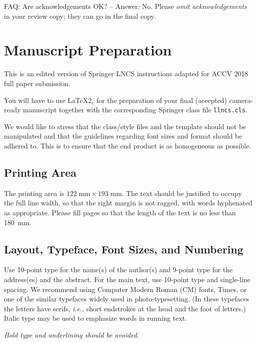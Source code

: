 \documentclass[runningheads]{llncs}
\begin{document}
\noindent FAQ: Are acknowledgements OK?  -- Answer: No. Please {\it omit
acknowledgements} in your review copy; they can go in the final copy.

\section{Manuscript Preparation}

This is an edited version of Springer LNCS instructions adapted for
ACCV 2018 full paper submission. 

You will have to use \LaTeX2$_\varepsilon$ for the
preparation of your final (accepted)
camera-ready manuscript together with the corresponding Springer
class file \verb+llncs.cls+.

We would like to stress that the class/style files and the template
should not be manipulated and that the guidelines regarding font sizes
and format should be adhered to. This is to ensure that the end product
is as homogeneous as possible.

\subsection{Printing Area}

The printing area is $122  \; \mbox{mm} \times 193 \;
\mbox{mm}$.
The text should be justified to occupy the full line width,
so that the right margin is not ragged, with words hyphenated as
appropriate. Please fill pages so that the length of the text
is no less than 180~mm.

\subsection{Layout, Typeface, Font Sizes, and Numbering}

Use 10-point type for the name(s) of the author(s) and 9-point type for
the address(es) and the abstract. For the main text, use 10-point
type and single-line spacing.
We recommend using Computer Modern Roman (CM) fonts, Times, or one
of the similar typefaces widely used in photo-typesetting.
(In these typefaces the letters have serifs, {\it i.e.}, short endstrokes at
the head and the foot of letters.)
Italic type may be used to emphasize words in running text. 

{\it Bold type and underlining should be avoided.}
\end{document}
